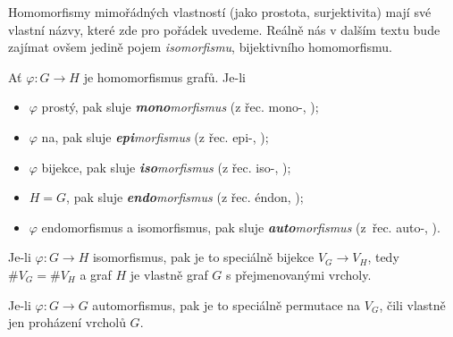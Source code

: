 Homomorfismy mimořádných vlastností (jako prostota, surjektivita) mají své
vlastní názvy, které zde pro pořádek uvedeme. Reálně nás v dalším textu bude
zajímat ovšem jedině pojem \emph{isomorfismu}, bijektivního homomorfismu.

\begin{definition}
 \label{def:morfismy}
 Ať $\varphi:G \to H$ je homomorfismus grafů. Je-li
 \begin{itemize}
  \item $\varphi$ prostý, pak sluje \emph{\textbf{mono}morfismus} (z řec. mono-,
   );
  \item $\varphi$ na, pak sluje \emph{\textbf{epi}morfismus} (z řec. epi-, );
  \item $\varphi$ bijekce, pak sluje \emph{\textbf{iso}morfismus} (z řec. iso-,
   );
  \item $H = G$, pak sluje \emph{\textbf{endo}morfismus} (z řec. éndon,
   );
  \item $\varphi$ endomorfismus a isomorfismus, pak sluje
   \emph{\textbf{auto}morfismus} (z~řec. auto-, ).
 \end{itemize}
\end{definition}

\begin{remark}
 Je-li $\varphi:G \to H$ isomorfismus, pak je to speciálně bijekce $V_G \to
 V_H$, tedy $\# V_G = \# V_H$ a graf $H$ je vlastně graf $G$ s přejmenovanými
 vrcholy.

 Je-li $\varphi:G \to G$ automorfismus, pak je to speciálně permutace na $V_G$,
 čili vlastně jen proházení vrcholů $G$.
\end{remark}

